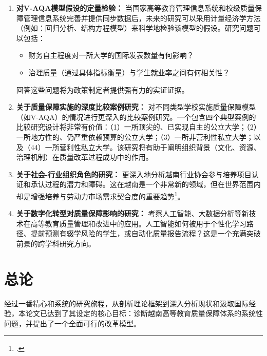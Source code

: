\begin{enumerate}
    \item \textbf{对V-AQA模型假设的定量检验：} 当国家高等教育管理信息系统和校级质量保障管理信息系统完善并提供同步数据后，未来的研究可以采用计量经济学方法（例如：回归分析、结构方程模型）来科学地检验该模型的假设。研究问题可以包括：
        \begin{itemize}
            \item 财务自主程度对一所大学的国际发表数量有何影响？
            \item 治理质量（通过具体指标衡量）与学生就业率之间有何相关性？
        \end{itemize}
    回答这些问题将为政策制定者提供强有力的实证证据。

    \item \textbf{关于质量保障实施的深度比较案例研究：} 对不同类型学校实施质量保障模型（如V-AQA）的情况进行更深入的比较案例研究。一个包含四个典型案例的比较研究设计将非常有价值：（1）一所顶尖的、已实现自主的公立大学；（2）一所地方性的、仍严重依赖预算的公立大学；（3）一所非营利性私立大学；以及（44）一所营利性私立大学。该研究将有助于阐明组织背景（文化、资源、治理机制）在质量改革过程成功中的作用。

    \item \textbf{关于社会-行业组织角色的研究：} 更深入地分析越南行业协会参与培养项目认证和承认过程的潜力和障碍。这在越南是一个非常新的领域，但在世界范围内却是增强培养与劳动力市场需求契合度的重要趋势\footcite{CHEA_prof_acreditation}。
    
    \item \textbf{关于数字化转型对质量保障影响的研究：} 考察人工智能、大数据分析等新技术在高等教育质量管理和改进中的应用。人工智能如何被用于个性化学习路径、提前预测有辍学风险的学生，或自动化质量报告流程？这是一个充满突破前景的跨学科研究方向。
\end{enumerate}


\section*{总论}
\label{sec:ket_luan_tong_the}

经过一番精心和系统的研究旅程，从剖析理论框架到深入分析现状和汲取国际经验，本论文已达到了其设定的核心目标：诊断越南高等教育质量保障体系的系统性问题，并提出了一个全面可行的改革模型。

